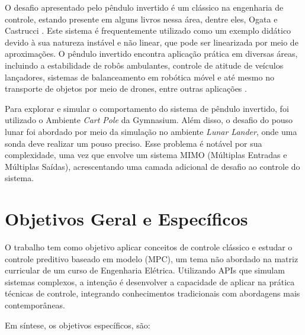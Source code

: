 \documentclass[12pt,           %
a4paper,                       %
openany,                       %
oneside,                       %
chapter=TITLE,                 %
english,                       %
spanish,                       %
brazil,                        %
sumario=tradicional]{abntex2}  %
\begin{document}
\begin{OnehalfSpace}
O desafio apresentado pelo pêndulo invertido é um clássico na engenharia de controle, estando presente em alguns livros nessa área, dentre eles, Ogata \cite{ogata2010engenharia} e Castrucci \cite{castrucci2011controle}. Este sistema é frequentemente utilizado como um exemplo didático devido à sua natureza instável e não linear, que pode ser linearizada por meio de aproximações. O pêndulo invertido encontra aplicação prática em diversas áreas, incluindo a estabilidade de robôs ambulantes, controle de atitude de veículos lançadores, sistemas de balanceamento em robótica móvel e até mesmo no transporte de objetos por meio de drones, entre outras aplicações \cite{kafetzis2017inverted}.

Para explorar e simular o comportamento do sistema de pêndulo invertido, foi utilizado o Ambiente \textit{Cart Pole} da Gymnasium. Além disso, o desafio do pouso lunar foi abordado por meio da simulação no ambiente \textit{Lunar Lander}, onde uma sonda deve realizar um pouso preciso. Esse problema é notável por sua complexidade, uma vez que envolve um sistema MIMO (Múltiplas Entradas e Múltiplas Saídas), acrescentando uma camada adicional de desafio ao controle do sistema.
	
\section{Objetivos Geral e Específicos}
\label{sec:objetivos}                      %
			
O trabalho tem como objetivo aplicar conceitos de controle clássico e estudar o controle preditivo baseado em modelo (MPC), um tema não abordado na matriz curricular de um curso de Engenharia Elétrica. Utilizando APIs que simulam sistemas complexos, a intenção é desenvolver a capacidade de aplicar na prática técnicas de controle, integrando conhecimentos tradicionais com abordagens mais contemporâneas. 

Em síntese, os objetivos específicos, são:
			

\end{OnehalfSpace}
\end{document}
